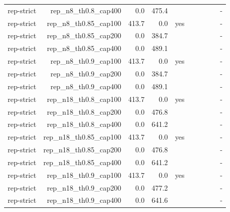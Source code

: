 \begin{table}[t]
\begin{tabular}{lrrrrrrrrr}
rep-strict & rep\_n8\_th0.8\_cap400 & 0.0 & 475.4 &  &  &  &  &  & - \\
rep-strict & rep\_n8\_th0.85\_cap100 & 413.7 & 0.0 & yes &  &  &  &  & - \\
rep-strict & rep\_n8\_th0.85\_cap200 & 0.0 & 384.7 &  &  &  &  &  & - \\
rep-strict & rep\_n8\_th0.85\_cap400 & 0.0 & 489.1 &  &  &  &  &  & - \\
rep-strict & rep\_n8\_th0.9\_cap100 & 413.7 & 0.0 & yes &  &  &  &  & - \\
rep-strict & rep\_n8\_th0.9\_cap200 & 0.0 & 384.7 &  &  &  &  &  & - \\
rep-strict & rep\_n8\_th0.9\_cap400 & 0.0 & 489.1 &  &  &  &  &  & - \\
rep-strict & rep\_n18\_th0.8\_cap100 & 413.7 & 0.0 & yes &  &  &  &  & - \\
rep-strict & rep\_n18\_th0.8\_cap200 & 0.0 & 476.8 &  &  &  &  &  & - \\
rep-strict & rep\_n18\_th0.8\_cap400 & 0.0 & 641.2 &  &  &  &  &  & - \\
rep-strict & rep\_n18\_th0.85\_cap100 & 413.7 & 0.0 & yes &  &  &  &  & - \\
rep-strict & rep\_n18\_th0.85\_cap200 & 0.0 & 476.8 &  &  &  &  &  & - \\
rep-strict & rep\_n18\_th0.85\_cap400 & 0.0 & 641.2 &  &  &  &  &  & - \\
rep-strict & rep\_n18\_th0.9\_cap100 & 413.7 & 0.0 & yes &  &  &  &  & - \\
rep-strict & rep\_n18\_th0.9\_cap200 & 0.0 & 477.2 &  &  &  &  &  & - \\
rep-strict & rep\_n18\_th0.9\_cap400 & 0.0 & 641.6 &  &  &  &  &  & - \\
\bottomrule
\end{tabular}
\end{table}
